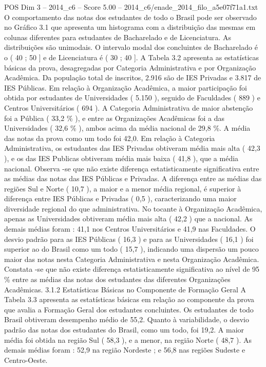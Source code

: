 \begin{textsample}{POS Dim 3 – 2014\_c6 – Score 5.00 – 2014\_c6/enade\_2014\_filo\_a5e07f71a1.txt}
O comportamento das notas dos estudantes de todo o Brasil pode ser observado no Gráfico 3.1 que apresenta um histograma com a distribuição das mesmas em colunas diferentes para estudantes de Bacharelado e de Licenciatura.
As distribuições são unimodais.
O intervalo modal dos concluintes de Bacharelado é o ( 40 ; 50 ] e de Licenciatura é ( 30 ; 40 ].
A Tabela 3.2 apresenta as estatísticas básicas da prova, desagregadas por Categoria Administrativa e por Organização Acadêmica.
Da população total de inscritos, 2.916 são de IES Privadas e 3.817 de IES Públicas.
Em relação à Organização Acadêmica, a maior participação foi obtida por estudantes de Universidades ( 5.150 ), seguido de Faculdades ( 889 ) e Centros Universitários ( 694 ).
A Categoria Administrativa de maior abstenção foi a Pública ( 33,2 \% ), e entre as Organizações Acadêmicas foi a das Universidades ( 32,6 \% ), ambos acima da média nacional de 29,8 \%.
A média das notas da prova como um todo foi 42,0.
Em relação à Categoria Administrativa, os estudantes das IES Privadas obtiveram média mais alta ( 42,3 ), e os das IES Publicas obtiveram média mais baixa ( 41,8 ), que a média nacional.
Observa -se que não existe diferença estatisticamente significativa entre as médias das notas das IES Públicas e Privadas.
A diferença entre as médias das regiões Sul e Norte ( 10,7 ), a maior e a menor média regional, é superior à diferença entre IES Públicas e Privadas ( 0,5 ), caracterizando uma maior diversidade regional do que administrativa.
No tocante à Organização Acadêmica, apenas as Universidades obtiveram média mais alta ( 42,2 ) que a nacional.
As demais médias foram : 41,1 nos Centros Universitários e 41,9 nas Faculdades.
O desvio padrão para as IES Públicas ( 16,3 ) e para as Universidades ( 16,1 ) foi superior ao do Brasil como um todo ( 15,7 ), indicando uma dispersão um pouco maior das notas nesta Categoria Administrativa e nesta Organização Acadêmica.
Constata -se que não existe diferença estatisticamente significativa ao nível de 95 \% entre as médias das notas dos estudantes das diferentes Organizações Acadêmicas. 3.1.2 Estatísticas Básicas no Componente de Formação Geral A Tabela 3.3 apresenta as estatísticas básicas em relação ao componente da prova que avalia a Formação Geral dos estudantes concluintes.
Os estudantes de todo Brasil obtiveram desempenho médio de 55,2.
Quanto à variabilidade, o desvio padrão das notas dos estudantes do Brasil, como um todo, foi 19,2.
A maior média foi obtida na região Sul ( 58,3 ), e a menor, na região Norte ( 48,7 ).
As demais médias foram : 52,9 na região Nordeste ; e 56,8 nas regiões Sudeste e Centro-Oeste.

\end{textsample}
